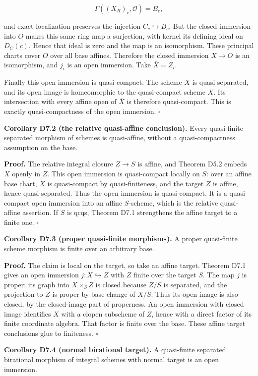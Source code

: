 \documentclass[11pt,a4paper,openany]{report}
\begin{document}
\[
\Gamma((X_R)_c,\mathcal O)=B_c,
\]

and exact localization preserves the injection \(C_c\hookrightarrow B_c\). But the closed immersion into \(O\) makes this same ring map a surjection, with kernel its defining ideal on \(D_C(c)\). Hence that ideal is zero and the map is an isomorphism. These principal charts cover \(O\) over all base affines. Therefore the closed immersion \(X\to O\) is an isomorphism, and \(j_i\) is an open immersion. Take \(\overline X=Z_i\).

Finally this open immersion is quasi-compact. The scheme \(\overline X\) is quasi-separated, and its open image is homeomorphic to the quasi-compact scheme \(X\). Its intersection with every affine open of \(\overline X\) is therefore quasi-compact. This is exactly quasi-compactness of the open immersion. \(\square\)

\textbf{Corollary D7.2 (the relative quasi-affine conclusion).} Every quasi-finite separated morphism of schemes is quasi-affine, without a quasi-compactness assumption on the base.

\textbf{Proof.} The relative integral closure \(Z\to S\) is affine, and Theorem D5.2 embeds \(X\) openly in \(Z\). This open immersion is quasi-compact locally on \(S\): over an affine base chart, \(X\) is quasi-compact by quasi-finiteness, and the target \(Z\) is affine, hence quasi-separated. Thus the open immersion is quasi-compact. It is a quasi-compact open immersion into an affine \(S\)-scheme, which is the relative quasi-affine assertion. If \(S\) is qcqs, Theorem D7.1 strengthens the affine target to a finite one. \(\square\)

\textbf{Corollary D7.3 (proper quasi-finite morphisms).} A proper quasi-finite scheme morphism is finite over an arbitrary base.

\textbf{Proof.} The claim is local on the target, so take an affine target. Theorem D7.1 gives an open immersion \(j:X\hookrightarrow Z\) with \(Z\) finite over the target \(S\). The map \(j\) is proper: its graph into \(X\times_SZ\) is closed because \(Z/S\) is separated, and the projection to \(Z\) is proper by base change of \(X/S\). Thus its open image is also closed, by the closed-image part of properness. An open immersion with closed image identifies \(X\) with a clopen subscheme of \(Z\), hence with a direct factor of its finite coordinate algebra. That factor is finite over the base. These affine target conclusions glue to finiteness. \(\square\)

\textbf{Corollary D7.4 (normal birational target).} A quasi-finite separated birational morphism of integral schemes with normal target is an open immersion.
\end{document}
